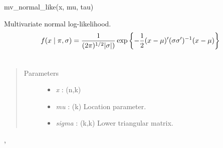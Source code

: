\documentclass[letterpaper,10pt,english]{sphinxmanual}
\begin{document}
\begin{fulllineitems}
\label{distributions:pymc.distributions.mv_normal_chol_like}
mv\_normal\_like(x, mu, tau)

Multivariate normal log-likelihood.
\begin{gather}
\begin{split}f(x \mid \pi, \sigma) = \frac{1}{(2\pi)^{1/2}|\sigma|)} \exp\left\{ -\frac{1}{2} (x-\mu)^{\prime}(\sigma \sigma^{\prime})^{-1}(x-\mu) \right\}\end{split}\notag\\\begin{split}\end{split}\notag
\end{gather}\begin{quote}\begin{description}
\item[{Parameters }] \leavevmode\begin{itemize}
\item {} 
\emph{x} : (n,k)

\item {} 
\emph{mu} : (k) Location parameter.

\item {} 
\emph{sigma} : (k,k) Lower triangular matrix.

\end{itemize}

\end{description}\end{quote}




{\hyperref[distributions:pymc.distributions.mv_normal_like]{}}, {\hyperref[distributions:pymc.distributions.mv_normal_cov_like]{}}



\end{fulllineitems}

\end{document}

